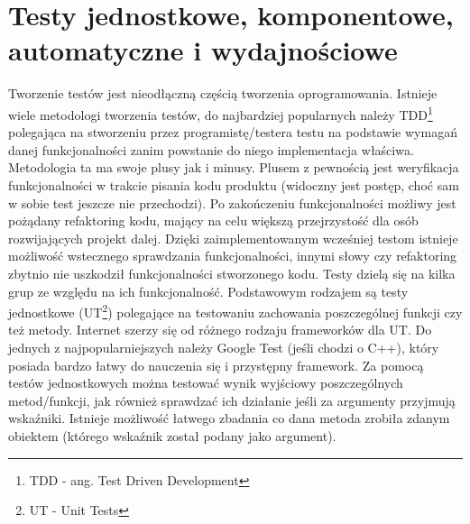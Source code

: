 \documentclass{BscUS}
\begin{document}
\section{Testy jednostkowe, komponentowe, automatyczne i wydajnościowe}
\indent Tworzenie testów jest nieodłączną częścią tworzenia oprogramowania. Istnieje wiele metodologi tworzenia testów, do najbardziej popularnych należy TDD\footnote{TDD - ang. Test Driven Development} polegająca na stworzeniu przez programistę/testera testu na podstawie wymagań danej funkcjonalności zanim powstanie do niego implementacja właściwa. Metodologia ta ma swoje plusy jak i minusy. Plusem z pewnością jest weryfikacja funkcjonalności w trakcie pisania kodu produktu (widoczny jest postęp, choć sam w sobie test jeszcze nie przechodzi). Po zakończeniu funkcjonalności możliwy jest pożądany refaktoring kodu, mający na celu większą przejrzystość dla osób rozwijających projekt dalej. Dzięki zaimplementowanym wcześniej testom istnieje możliwość wstecznego sprawdzania funkcjonalności, innymi słowy czy refaktoring zbytnio nie uszkodził funkcjonalności stworzonego kodu.
\newline
\indent Testy dzielą się na kilka grup ze względu na ich funkcjonalność. Podstawowym rodzajem są testy jednostkowe (UT\footnote{UT - Unit Tests}) polegające na testowaniu zachowania poszczególnej funkcji czy też metody. Internet szerzy się od różnego rodzaju frameworków dla UT. Do jednych z najpopularniejszych należy Google Test (jeśli chodzi o C++), który posiada bardzo łatwy do nauczenia się i przystępny framework. Za pomocą testów jednostkowych można testować wynik wyjściowy poszczególnych metod/funkcji, jak również sprawdzać ich działanie jeśli za argumenty przyjmują wskaźniki. Istnieje możliwość łatwego zbadania co dana metoda zrobiła zdanym obiektem (którego wskaźnik został podany jako argument).
\newline
\end{document}
